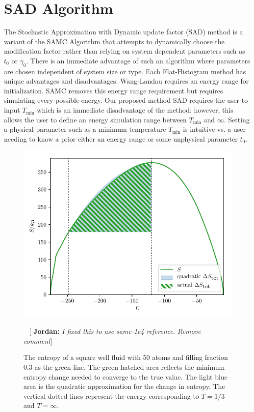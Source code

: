 \documentclass[letterpaper,twocolumn,amsmath,amssymb,pre,aps,10pt]{revtex4-1}
\newcommand{\blue}[1]{{\bf \color{blue} #1}}
\newcommand{\jpsays}[1]{{\color{red} [\blue{Jordan:} \emph{#1}]}}
\begin{document}
\section{SAD Algorithm}\label{sec:sad}
The Stochastic Approximation with Dynamic update factor (SAD) method
is a variant of the SAMC
Algorithm that attempts to dynamically choose the modification factor
rather than relying on system dependent parameters such as $t_0$ or
$\gamma_0$.  There is an immediate advantage of such an algorithm where
parameters are chosen independent of system size or type. Each
Flat-Histogram method has unique advantages and disadvantages.
Wang-Landau requires an energy range for initialization.  SAMC removes
this energy range requirement but requires simulating every possible
energy. Our proposed method SAD requires the user to input
$T_\text{min}$ which is an immediate disadvantage of the method;
however, this allows the user to define an energy simulation
range between $T_\text{min}$ and $\infty$. Setting a physical parameter
such as a minimum temperature $T_\text{min}$ is intuitive vs. a user
needing to know a prior either an energy range or some unphysical
parameter $t_0$.

\begin{figure}
  \includegraphics[width=\columnwidth]{figs/N50-lndos-comparison}
  \caption{The entropy of a square well fluid with 50 atoms and filling fraction
        0.3 as the green line.  The green hatched area reflects the
        minimum entropy change needed to converge to the true value.
        The light blue area is the quadratic approximation
        for the change in entropy.  The vertical dotted lines represent
        the energy corresponding to $T=1/3$ and $T=\infty$.}
        ~\jpsays{I fixed this to use samc-1e4 reference. Remove comment}
  \label{fig:entropy-cartoon}
\end{figure}
\end{document}
